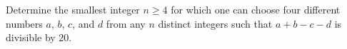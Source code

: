 Determine the smallest integer $n \geq 4$ for which one can choose four different numbers $a$, $b$, $c$, and $d$ from any $n$ distinct integers such that $a+b-c-d$ is divisible by 20.
